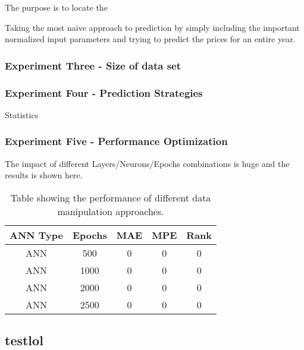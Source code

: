 The purpose is to locate the 


Taking the most naive approach to prediction by simply including the important normalized input parameters and trying to predict the prices for an entire year. 

\subsubsection{Experiment Three - Size of data set}

\subsubsection{Experiment Four - Prediction Strategies}
Statistics


\subsubsection{Experiment Five - Performance Optimization}
The impact of different Layers/Neurons/Epochs combinations is huge and the results is shown here.

\begin{table}[H]
\centering  %
\begin{tabular}{c c c c c} %
ANN Type & Epochs & MAE & MPE & Rank \\ [0.5ex] %
\hline                  %
ANN & 500 & 0 & 0 & 0 \\ %
ANN & 1000 & 0 & 0 & 0 \\
ANN & 2000 & 0 & 0 & 0 \\
ANN & 2500 & 0 & 0 & 0 \\ [1ex] %
\hline %
\end{tabular}
\caption{Table showing the performance of different data manipulation approaches.} %
\label{table:performanceOpti} %
\end{table} 

\subsection{testlol}

